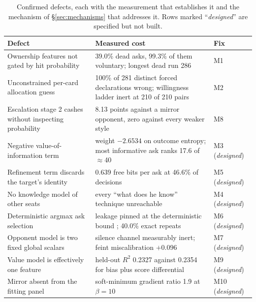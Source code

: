 \documentclass[11pt]{article}
\theoremstyle{definition}
\providecommand{\numDeadAsk}{39.0}
\providecommand{\numRepeatAsk}{40.0}
\providecommand{\numDeadRunLongest}{286}
\providecommand{\numForcedWrongRate}{100}
\providecommand{\numInfoRank}{17.6}
\providecommand{\numEntropyWeight}{-2.6534}
\providecommand{\numVoluntaryDead}{99.3}
\providecommand{\numForcedN}{281}
\providecommand{\numRungZeroPairs}{210}
\providecommand{\numStageTwoCost}{8.13}
\providecommand{\numFeintBias}{0.096}
\providecommand{\numTargetTwo}{46.6}
\providecommand{\numTargetBits}{0.639}
\providecommand{\numValueRSq}{0.2327}
\providecommand{\numValueRSqScore}{0.2354}
\providecommand{\numSoftMinBeta}{10}
\providecommand{\numSoftMinRatio}{1.9}
\begin{document}
\begin{table}[t]
\centering
\caption{Confirmed defects, each with the measurement that establishes it and the
mechanism of \S\ref{sec:mechanisms} that addresses it. Rows marked
``\emph{designed}'' are specified but not built.}
\label{tab:defects}
\begin{tabular}{p{}p{}l}
\toprule
\textbf{Defect} & \textbf{Measured cost} & \textbf{Fix} \\
\midrule
Ownership features not gated by hit probability &
\numDeadAsk\% dead asks, \numVoluntaryDead\% of them voluntary; longest dead run
\numDeadRunLongest{} & M1 \\
Unconstrained per-card allocation guess &
\numForcedWrongRate\% of \numForcedN{} distinct forced declarations wrong; willingness
ladder inert at \numRungZeroPairs{} of \numRungZeroPairs{} pairs & M2 \\
Escalation stage 2 cashes without inspecting probability &
\numStageTwoCost{} points against a mirror opponent, zero against every weaker
style & M8 \\
Negative value-of-information term &
weight $\numEntropyWeight$ on outcome entropy; most informative ask ranks
\numInfoRank{} of $\approx$40 & M3 (\emph{designed}) \\
Refinement term discards the target's identity &
\numTargetBits{} free bits per ask at \numTargetTwo\% of decisions & M5
(\emph{designed}) \\
No knowledge model of other seats &
every ``what does he know'' technique unreachable & M4 (\emph{designed}) \\
Deterministic argmax ask selection &
leakage pinned at the deterministic bound \cite{alvim-leakage};
\numRepeatAsk\% exact repeats & M6 (\emph{designed}) \\
Opponent model is two fixed global scalars &
silence channel measurably inert; feint miscalibration $+\numFeintBias$ & M7
(\emph{designed}) \\
Value model is effectively one feature &
held-out $R^2$ \numValueRSq{} against \numValueRSqScore{} for bias plus score
differential & M9 (\emph{designed}) \\
Mirror absent from the fitting panel &
soft-minimum gradient ratio \numSoftMinRatio{} at $\beta=\numSoftMinBeta$ & M10
(\emph{designed}) \\
\bottomrule
\end{tabular}
\end{table}
\end{document}
